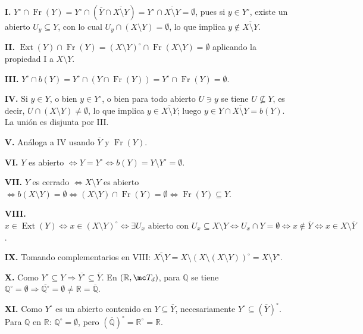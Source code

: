 \begin{dem}
\begin{itemize}
    \item[\textbf{I.}] $Y^\circ \cap \operatorname{Fr}(Y) = Y^\circ \cap (\overline{Y} \cap \overline{X \setminus Y}) = Y^\circ \cap \overline{X \setminus Y} = \emptyset$, pues si $y \in Y^\circ$, existe un abierto $U_y \subseteq Y$, con lo cual $U_y \cap (X \setminus Y) = \emptyset$, lo que implica $y \notin \overline{X \setminus Y}$.
    \item[\textbf{II.}] $\operatorname{Ext}(Y) \cap \operatorname{Fr}(Y) = (X \setminus Y)^\circ \cap \operatorname{Fr}(X \setminus Y) = \emptyset$ aplicando la propiedad I a $X \setminus Y$.
    \item[\textbf{III.}] $Y^\circ \cap b(Y) = Y^\circ \cap (Y \cap \operatorname{Fr}(Y)) = Y^\circ \cap \operatorname{Fr}(Y) = \emptyset$.
    \item[\textbf{IV.}] Si $y \in Y$, o bien $y \in Y^\circ$, o bien para todo abierto $U \ni y$ se tiene $U \not\subseteq Y$, es decir, $U \cap (X \setminus Y) \ne \emptyset$, lo que implica $y \in \overline{X \setminus Y}$; luego $y \in Y \cap \overline{X \setminus Y} = b(Y)$. La unión es disjunta por III.
    \item[\textbf{V.}] Análoga a IV usando $\overline{Y}$ y $\operatorname{Fr}(Y)$.
    \item[\textbf{VI.}] $Y$ es abierto $\iff Y = Y^\circ \iff b(Y) = Y \setminus Y^\circ = \emptyset$.
    \item[\textbf{VII.}] $Y$ es cerrado $\iff X \setminus Y$ es abierto $\iff b(X \setminus Y) = \emptyset \iff (X \setminus Y) \cap \operatorname{Fr}(Y) = \emptyset \iff \operatorname{Fr}(Y) \subseteq Y$.
    \item[\textbf{VIII.}] $x \in \operatorname{Ext}(Y) \iff x \in (X \setminus Y)^\circ \iff \exists U_x \text{ abierto con } U_x \subseteq X \setminus Y \iff U_x \cap Y = \emptyset \iff x \notin \overline{Y} \iff x \in X \setminus \overline{Y}$.
    \item[\textbf{IX.}] Tomando complementarios en VIII: $\overline{X \setminus Y} = X \setminus (X \setminus (X \setminus Y))^\circ = X \setminus Y^\circ$.
    \item[\textbf{X.}] Como $Y^\circ \subseteq Y \Rightarrow \overline{Y^\circ} \subseteq \overline{Y}$. En $(\mathbb{R}, \mc T_d)$, para $\mathbb{Q}$ se tiene $\mathbb{Q}^\circ = \emptyset \Rightarrow \overline{\mathbb{Q}^\circ} = \emptyset \ne \mathbb{R} = \overline{\mathbb{Q}}$.
    \item[\textbf{XI.}] Como $Y^\circ$ es un abierto contenido en $Y \subseteq \overline{Y}$, necesariamente $Y^\circ \subseteq (\overline{Y})^\circ$. Para $\mathbb{Q}$ en $\mathbb{R}$: $\mathbb{Q}^\circ = \emptyset$, pero $(\overline{\mathbb{Q}})^\circ = \mathbb{R}^\circ = \mathbb{R}$.
\end{itemize}
\end{dem}

